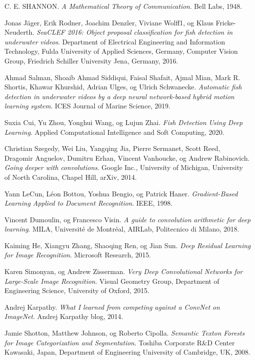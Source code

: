 \documentclass[11ot]{article}
\begin{document}
\begin{thebibliography}{9}
C. E. SHANNON. 
\textit{A Mathematical Theory of Communication}. 
Bell Labs, 1948.

Jonas Jäger, Erik Rodner, Joachim Denzler, Viviane Wolff1, og Klaus Fricke-Neuderth. 
\textit{SeaCLEF 2016: Object proposal classification for fish detection in underwater videos}. 
Department of Electrical Engineering and Information Technology, Fulda University of Applied Sciences, Germany, Computer Vision Group, Friedrich Schiller University Jena, Germany, 2016.

Ahmad Salman, Shoaib Ahmad Siddiqui, Faisal Shafait, Ajmal Mian, Mark R. Shortis, Khawar Khurshid, Adrian Ulges, og Ulrich Schwanecke. 
\textit{Automatic fish detection in underwater videos by a deep neural network-based hybrid motion learning system}. 
ICES Journal of Marine Science, 2019.

Suxia Cui, Yu Zhou, Yonghui Wang, og Lujun Zhai. 
\textit{Fish Detection Using Deep Learning}. 
Applied Computational Intelligence and Soft Computing, 2020.

Christian Szegedy, Wei Liu, Yangqing Jia, Pierre Sermanet, Scott Reed, Dragomir Anguelov, Dumitru Erhan, Vincent Vanhoucke, og Andrew Rabinovich. 
\textit{Going deeper with convolutions}. 
Google Inc., University of Michigan, University of North Carolina, Chapel Hill, arXiv, 2014.

Yann LeCun, Léon Bottou, Yoshua Bengio, og Patrick Haner. 
\textit{Gradient-Based Learning Applied to Document Recognition}. 
IEEE, 1998.

Vincent Dumoulin, og Francesco Visin. 
\textit{A guide to convolution arithmetic for deep learning}. 
MILA, Université de Montréal, AIRLab, Politecnico di Milano, 2018.

Kaiming He, Xiangyu Zhang, Shaoqing Ren, og Jian Sun. 
\textit{Deep Residual Learning for Image Recognition}. 
Microsoft Research, 2015.

Karen Simonyan, og Andrew Zisserman. 
\textit{Very Deep Convolutional Networks for Large-Scale Image Recognition}. 
Visual Geometry Group, Department of Engineering Science, University of Oxford, 2015.

Andrej Karpathy. 
\textit{What I learned from competing against a ConvNet on ImageNet}. 
Andrej Karpathy blog, 2014.

Jamie Shotton, Matthew Johnson, og Roberto Cipolla. 
\textit{Semantic Texton Forests for Image Categorization and Segmentation}. 
Toshiba Corporate R\&D Center Kawasaki, Japan, Department of Engineering University of Cambridge, UK, 2008.


\end{thebibliography}
\end{document}

